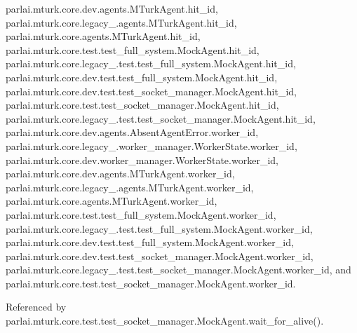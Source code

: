 parlai.\+mturk.\+core.\+dev.\+agents.\+M\+Turk\+Agent.\+hit\+\_\+id, parlai.\+mturk.\+core.\+legacy\+\_.\+agents.\+M\+Turk\+Agent.\+hit\+\_\+id, parlai.\+mturk.\+core.\+agents.\+M\+Turk\+Agent.\+hit\+\_\+id, parlai.\+mturk.\+core.\+test.\+test\+\_\+full\+\_\+system.\+Mock\+Agent.\+hit\+\_\+id, parlai.\+mturk.\+core.\+legacy\+\_.\+test.\+test\+\_\+full\+\_\+system.\+Mock\+Agent.\+hit\+\_\+id, parlai.\+mturk.\+core.\+dev.\+test.\+test\+\_\+full\+\_\+system.\+Mock\+Agent.\+hit\+\_\+id, parlai.\+mturk.\+core.\+dev.\+test.\+test\+\_\+socket\+\_\+manager.\+Mock\+Agent.\+hit\+\_\+id, parlai.\+mturk.\+core.\+test.\+test\+\_\+socket\+\_\+manager.\+Mock\+Agent.\+hit\+\_\+id, parlai.\+mturk.\+core.\+legacy\+\_.\+test.\+test\+\_\+socket\+\_\+manager.\+Mock\+Agent.\+hit\+\_\+id, parlai.\+mturk.\+core.\+dev.\+agents.\+Absent\+Agent\+Error.\+worker\+\_\+id, parlai.\+mturk.\+core.\+legacy\+\_.\+worker\+\_\+manager.\+Worker\+State.\+worker\+\_\+id, parlai.\+mturk.\+core.\+dev.\+worker\+\_\+manager.\+Worker\+State.\+worker\+\_\+id, parlai.\+mturk.\+core.\+dev.\+agents.\+M\+Turk\+Agent.\+worker\+\_\+id, parlai.\+mturk.\+core.\+legacy\+\_.\+agents.\+M\+Turk\+Agent.\+worker\+\_\+id, parlai.\+mturk.\+core.\+agents.\+M\+Turk\+Agent.\+worker\+\_\+id, parlai.\+mturk.\+core.\+test.\+test\+\_\+full\+\_\+system.\+Mock\+Agent.\+worker\+\_\+id, parlai.\+mturk.\+core.\+legacy\+\_.\+test.\+test\+\_\+full\+\_\+system.\+Mock\+Agent.\+worker\+\_\+id, parlai.\+mturk.\+core.\+dev.\+test.\+test\+\_\+full\+\_\+system.\+Mock\+Agent.\+worker\+\_\+id, parlai.\+mturk.\+core.\+dev.\+test.\+test\+\_\+socket\+\_\+manager.\+Mock\+Agent.\+worker\+\_\+id, parlai.\+mturk.\+core.\+legacy\+\_.\+test.\+test\+\_\+socket\+\_\+manager.\+Mock\+Agent.\+worker\+\_\+id, and parlai.\+mturk.\+core.\+test.\+test\+\_\+socket\+\_\+manager.\+Mock\+Agent.\+worker\+\_\+id.



Referenced by parlai.\+mturk.\+core.\+test.\+test\+\_\+socket\+\_\+manager.\+Mock\+Agent.\+wait\+\_\+for\+\_\+alive().

